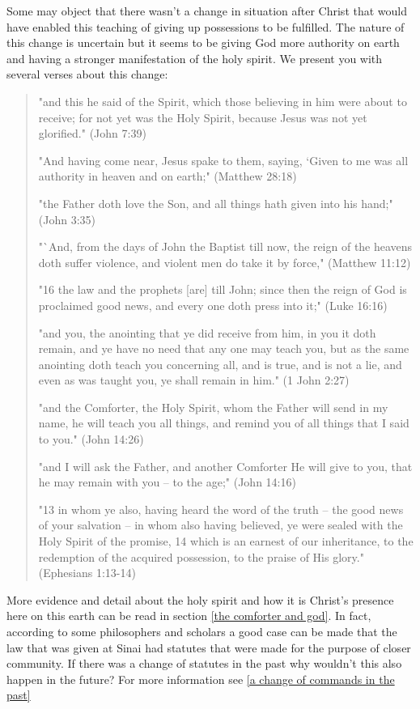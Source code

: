 \documentclass[11pt]{article}
\begin{document}
Some may object that there wasn't a change in situation after Christ that would have enabled this teaching of giving up possessions to be fulfilled. The nature of this change is uncertain but it seems to be giving God more authority on earth and having a stronger manifestation of the holy spirit. We present you with several verses about this change:
\begin{quote}
"and this he said of the Spirit, which those believing in him were about to receive; for not yet was the Holy Spirit, because Jesus was not yet glorified." (John 7:39)

"And having come near, Jesus spake to them, saying, `Given to me was all authority in heaven and on earth;" (Matthew 28:18)

"the Father doth love the Son, and all things hath given into his hand;" (John 3:35)

"`And, from the days of John the Baptist till now, the reign of the heavens doth suffer violence, and violent men do take it by force," (Matthew 11:12)

"16 the law and the prophets [are] till John; since then the reign of God is proclaimed good news, and every one doth press into it;" (Luke 16:16)

"and you, the anointing that ye did receive from him, in you it doth remain, and ye have no need that any one may teach you, but as the same anointing doth teach you concerning all, and is true, and is not a lie, and even as was taught you, ye shall remain in him." (1 John 2:27)

"and the Comforter, the Holy Spirit, whom the Father will send in my name, he will teach you all things, and remind you of all things that I said to you." (John 14:26)

"and I will ask the Father, and another Comforter He will give to you, that he may remain with you -- to the age;"
(John 14:16)

"13 in whom ye also, having heard the word of the truth -- the good news of your salvation -- in whom also having believed, ye were sealed with the Holy Spirit of the promise,
14 which is an earnest of our inheritance, to the redemption of the acquired possession, to the praise of His glory." (Ephesians 1:13-14)
\end{quote}
More evidence and detail about the holy spirit and how it is Christ's presence here on this earth can be read in section \ref{the comforter and god}. In fact, according to some philosophers and scholars a good case can be made that the law that was given at Sinai had statutes that were made for the purpose of closer community. If there was a change of statutes in the past why wouldn't this also happen in the future? For more information see \ref{a change of commands in the past}
\end{document}
